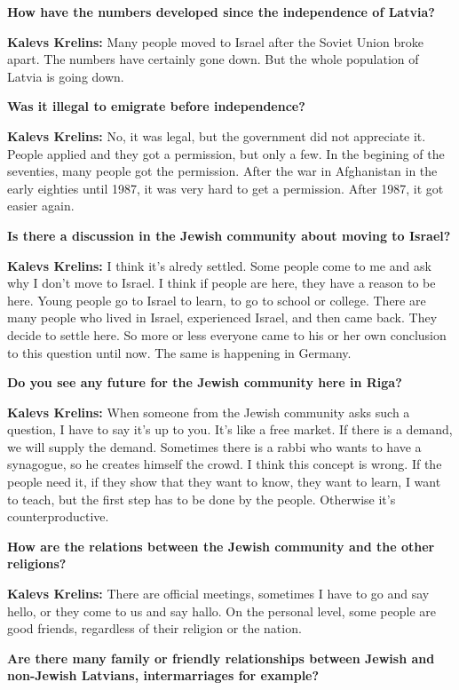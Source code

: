 \textbf{How have the numbers developed since the independence of Latvia?}  

\textbf{Kalevs Krelins:} Many people moved to Israel after the Soviet Union broke apart. The numbers have certainly gone down. But the whole population of Latvia is going down.  

\textbf{Was it illegal to emigrate before independence?} 

\textbf{Kalevs Krelins:} No, it was legal, but the government did not appreciate it. People applied and they got a permission, but only a few. In the begining of the seventies, many people got the permission. After the war in Afghanistan in the early eighties until 1987, it was very hard to get a permission. After 1987, it got easier again. 

\textbf{Is there a discussion in the Jewish community about moving to Israel?} 

\textbf{Kalevs Krelins:} I think it's alredy settled. Some people come to me and ask why I don't move to Israel. I think if people are here, they have a reason to be here. Young people go to Israel to learn, to go to school or college. There are many people who lived in Israel, experienced Israel, and then came back. They decide to settle here. So more or less everyone came to his or her own conclusion to this question until now. The same is happening in Germany.  

\textbf{Do you see any future for the Jewish community here in Riga?} 

\textbf{Kalevs Krelins:} When someone from the Jewish community asks such a question, I have to say it’s up to you. It’s like a free market. If there is a demand, we will supply the demand. Sometimes there is a rabbi who wants to have a synagogue, so he creates himself the crowd. I think this concept is wrong. If the people need it, if they show that they want to know, they want to learn, I want to teach, but the first step has to be done by the people. Otherwise it’s counterproductive.  

\textbf{How are the relations between the Jewish community and the other religions?} 

\textbf{Kalevs Krelins:} There are official meetings, sometimes I have to go and say hello, or they come to us and say hallo. On the personal level, some people are good friends, regardless of their religion or the nation.  

\textbf{Are there many family or friendly relationships between Jewish and non-Jewish Latvians, intermarriages for example?} 

